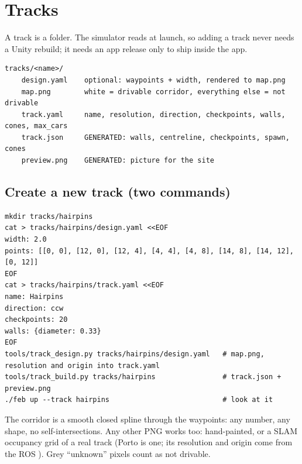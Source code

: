 \documentclass[11pt,a4paper]{article}
\begin{document}
\section{Tracks}

A track is a folder. The simulator reads  at launch, so adding a track never
needs a Unity rebuild; it needs an app release only to ship inside the app.

\begin{lstlisting}
tracks/<name>/
    design.yaml    optional: waypoints + width, rendered to map.png
    map.png        white = drivable corridor, everything else = not drivable
    track.yaml     name, resolution, direction, checkpoints, walls, cones, max_cars
    track.json     GENERATED: walls, centreline, checkpoints, spawn, cones
    preview.png    GENERATED: picture for the site
\end{lstlisting}

\subsection{Create a new track (two commands)}

\begin{lstlisting}
mkdir tracks/hairpins
cat > tracks/hairpins/design.yaml <<EOF
width: 2.0
points: [[0, 0], [12, 0], [12, 4], [4, 4], [4, 8], [14, 8], [14, 12], [0, 12]]
EOF
cat > tracks/hairpins/track.yaml <<EOF
name: Hairpins
direction: ccw
checkpoints: 20
walls: {diameter: 0.33}
EOF
tools/track_design.py tracks/hairpins/design.yaml   # map.png, resolution and origin into track.yaml
tools/track_build.py tracks/hairpins                # track.json + preview.png
./feb up --track hairpins                           # look at it
\end{lstlisting}

The corridor is a smooth closed spline through the waypoints: any number, any shape, no
self-intersections. Any other PNG works too: hand-painted, or a SLAM occupancy grid of a real
track (Porto is one; its resolution and origin come from the ROS ). Grey
``unknown'' pixels count as not drivable.
\end{document}
